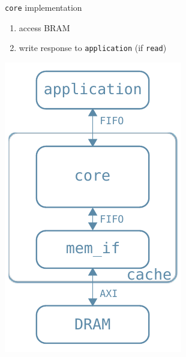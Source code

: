 \documentclass{beamer}
\begin{document}
\begin{frame}{\texttt{core} implementation}
\begin{minipage}{.7\textwidth}
\begin{enumerate}[<+->]
\begin{itemize}
				\end{itemize}
			\item access BRAM
			\item write response to \texttt{application}
				(if \texttt{read})
		\end{enumerate}
	\end{minipage}
	\begin{minipage}{.28\textwidth}
		\begin{center}
			\includegraphics[width=.9\textwidth,height=.9\textheight,keepaspectratio]{internal_arch.pdf}
		\end{center}
	\end{minipage}
\end{frame}
\end{document}
